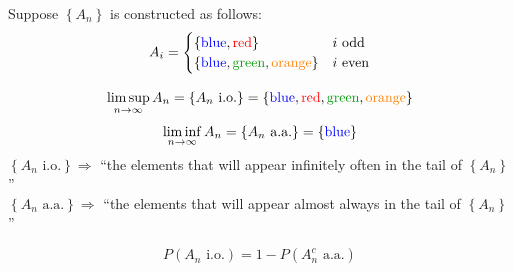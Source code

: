 \begin{example}
    Suppose $\left\{A_n\right\}$ is constructed as follows:
    \[A_i = \begin{cases}
        \left\{\textcolor{blue}{\text{blue}}, \textcolor{red}{\text{red}}\right\} & i \text{ odd}\\
        \left\{\textcolor{blue}{\text{blue}}, \textcolor{green!60!black}{\text{green}}, \textcolor{orange}{\text{orange}}\right\} & i \text{ even}
    \end{cases}\]
    \begin{center}
    \end{center}
    \[\limsup_{n\to\infty} A_n = \left\{A_n \text{ i.o.}\right\} = \left\{\textcolor{blue}{\text{blue}}, \textcolor{red}{\text{red}}, \textcolor{green!60!black}{\text{green}}, \textcolor{orange}{\text{orange}}\right\}\]
    \[\liminf_{n\to\infty} A_n = \left\{A_n \text{ a.a.}\right\} = \left\{\textcolor{blue}{\text{blue}}\right\}\]
    $\left\{A_n \text{ i.o.}\right\} \Rightarrow$ ``the elements that will appear infinitely often in the tail of $\left\{A_n\right\}$''
    \\$\left\{A_n \text{ a.a.}\right\} \Rightarrow$ ``the elements that will appear almost always in the tail of $\left\{A_n\right\}$''
\end{example}

\begin{reqproof}
\begin{corollary}[][5.2.1]
    \[P(A_n \text{ i.o.}) = 1 - P(A_n^c \text{ a.a.})\]
\end{corollary}
\end{reqproof}

